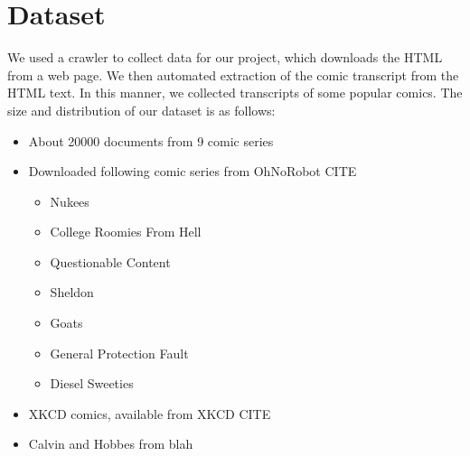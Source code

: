 \documentclass[11pt,twocolumn]{article}
\begin{document}
\section{Dataset}
We used a crawler to collect data for our project, which downloads the HTML from a web page. We then automated extraction of the comic transcript from the HTML text. In this manner, we collected transcripts of some popular comics. The size and distribution of our dataset is as follows:
\begin{itemize}
\item
  About 20000 documents from 9 comic series
\item
  Downloaded following comic series from OhNoRobot CITE
  \begin{itemize}
  \item Nukees
  \item College Roomies From Hell
  \item Questionable Content
  \item Sheldon
  \item Goats
  \item General Protection Fault
  \item Diesel Sweeties
  \end{itemize}
\item
  XKCD comics, available from XKCD CITE
\item
  Calvin and Hobbes from blah
\end{itemize}
\end{document}
